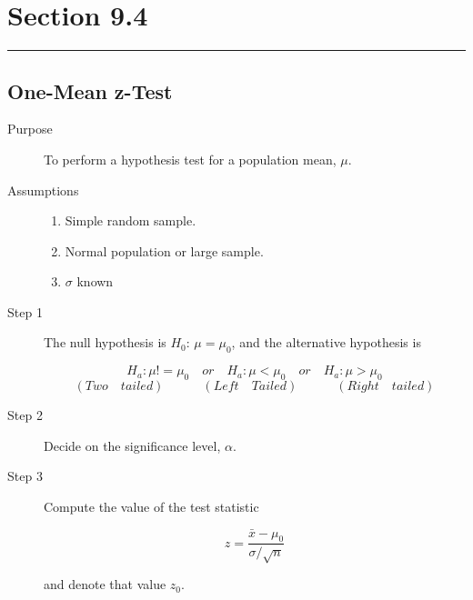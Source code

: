 \documentclass[12pt]{article}
\begin{document}
    \section*{Section 9.4}
    \noindent\rule{\textwidth}{0.4pt}
        \subsection*{One-Mean z-Test}
            \begin{description}
                \item[Purpose] To perform a hypothesis test for a population mean, $\mu$.
                \item[Assumptions]
                \begin{enumerate}
                    \item Simple random sample.
                    \item Normal population or large sample.
                    \item $\sigma$ known
                \end{enumerate}  
                \item[Step 1] The null hypothesis is $H_0$: $\mu = \mu_0$, and the alternative
                hypothesis is
                \begin{center}
                    \[
                        H_a: \mu != \mu_0 \quad or \quad H_a: \mu < \mu_0 \quad or \quad 
                        H_a: \mu > \mu_0    
                    \]
                    \[
                        (Two \quad tailed)\quad\quad\quad(Left \quad Tailed)\quad\quad\quad
                        (Right \quad tailed)    
                    \]                    
                \end{center}
                \item[Step 2] Decide on the significance level, $\alpha$.
                \item[Step 3] Compute the value of the test statistic 
                \begin{center}
                    \[
                        z = \frac{\bar{x} - \mu_0}{\sigma / \sqrt{n}}    
                    \]
                \end{center}
                and denote that value $z_0$.
            \end{description}
\end{document}
